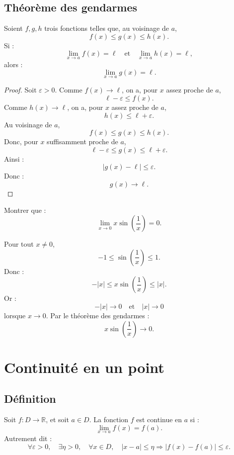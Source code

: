 \documentclass[11pt,a4paper]{article}
\newcommand{\R}{\mathbb R}
\newcommand{\implique}{\Longrightarrow}
\begin{document}
\subsection{Théorème des gendarmes}

\begin{theorembox}
Soient \(f,g,h\) trois fonctions telles que, au voisinage de \(a\),
\[
f(x)\leq g(x)\leq h(x).
\]
Si :
\[
\lim_{x\to a}f(x)=\ell
\quad\text{et}\quad
\lim_{x\to a}h(x)=\ell,
\]
alors :
\[
\lim_{x\to a}g(x)=\ell.
\]
\end{theorembox}

\begin{proof}
Soit \(\varepsilon>0\).  
Comme \(f(x)\to\ell\), on a, pour \(x\) assez proche de \(a\),
\[
\ell-\varepsilon\leq f(x).
\]
Comme \(h(x)\to\ell\), on a, pour \(x\) assez proche de \(a\),
\[
h(x)\leq \ell+\varepsilon.
\]
Au voisinage de \(a\),
\[
f(x)\leq g(x)\leq h(x).
\]
Donc, pour \(x\) suffisamment proche de \(a\),
\[
\ell-\varepsilon\leq g(x)\leq \ell+\varepsilon.
\]
Ainsi :
\[
|g(x)-\ell|\leq\varepsilon.
\]
Donc :
\[
g(x)\to\ell.
\]
\end{proof}

\begin{exercicebox}[Gendarmes]
Montrer que :
\[
\lim_{x\to0}x\sin\left(\frac1x\right)=0.
\]
\end{exercicebox}

\begin{correctionbox}
Pour tout \(x\neq0\),
\[
-1\leq \sin\left(\frac1x\right)\leq1.
\]
Donc :
\[
-|x|\leq x\sin\left(\frac1x\right)\leq |x|.
\]
Or :
\[
-|x|\to0
\quad\text{et}\quad
|x|\to0
\]
lorsque \(x\to0\).  
Par le théorème des gendarmes :
\[
x\sin\left(\frac1x\right)\to0.
\]
\end{correctionbox}

\section{Continuité en un point}

\subsection{Définition}

\begin{definitionbox}
Soit \(f:D\to\R\), et soit \(a\in D\).  
La fonction \(f\) est continue en \(a\) si :
\[
\lim_{x\to a}f(x)=f(a).
\]
Autrement dit :
\[
\forall\varepsilon>0,\quad \exists\eta>0,\quad \forall x\in D,\quad
|x-a|\leq\eta \implique |f(x)-f(a)|\leq\varepsilon.
\]
\end{definitionbox}
\end{document}
